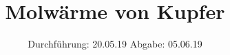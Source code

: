 

\subject{V47}
\title{Molwärme von Kupfer}
\date{
  Durchführung: 20.05.19
  \hspace{3em}
  Abgabe: 05.06.19
}



\maketitle
\thispagestyle{empty}
\tableofcontents
\newpage




%


%
\newpage
\printbibliography


